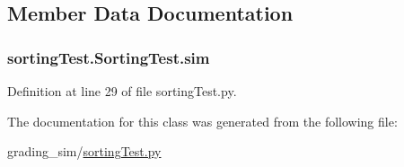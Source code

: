 \subsection{Member Data Documentation}
\hypertarget{classsorting_test_1_1_sorting_test_a2dcc99b63fb19bd7e7789303a491e784}{
\subsubsection[{sim}]{\setlength{\rightskip}{0pt plus 5cm}sorting\-Test.\-Sorting\-Test.\-sim}}\label{classsorting_test_1_1_sorting_test_a2dcc99b63fb19bd7e7789303a491e784}


Definition at line 29 of file sorting\-Test.\-py.



The documentation for this class was generated from the following file\-:\begin{DoxyCompactItemize}
\item 
grading\-\_\-sim/\hyperlink{grading__sim_2sorting_test_8py}{sorting\-Test.\-py}\end{DoxyCompactItemize}

